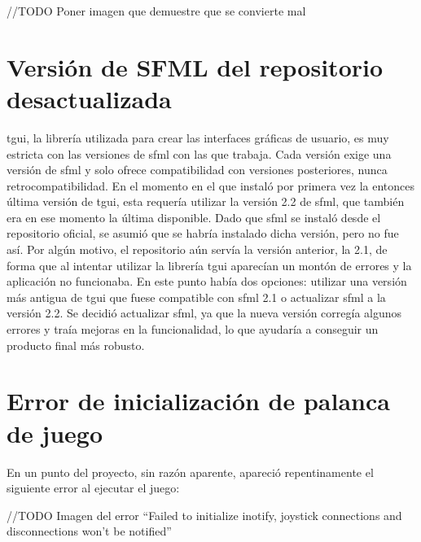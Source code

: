 	//TODO Poner imagen que demuestre que se convierte mal

\section{Versión de SFML del repositorio desactualizada}

	\acrshort{tgui}, la librería utilizada para crear las interfaces gráficas de usuario, es muy estricta con las versiones de \acrshort{sfml} con las que trabaja. Cada versión exige una versión de \acrshort{sfml} y solo ofrece compatibilidad con versiones posteriores, nunca retrocompatibilidad. En el momento en el que instaló por primera vez la entonces última versión de \acrshort{tgui}, esta requería utilizar la versión 2.2 de \acrshort{sfml}, que también era en ese momento la última disponible. Dado que \acrshort{sfml} se instaló desde el repositorio oficial, se asumió que se habría instalado dicha versión, pero no fue así. Por algún motivo, el repositorio aún servía la versión anterior, la 2.1, de forma que al intentar utilizar la librería \acrshort{tgui} aparecían un montón de errores y la aplicación no funcionaba. En este punto había dos opciones: utilizar una versión más antigua de \acrshort{tgui} que fuese compatible con \acrshort{sfml} 2.1 o actualizar \acrshort{sfml} a la versión 2.2. Se decidió actualizar \acrshort{sfml}, ya que la nueva versión corregía algunos errores y traía mejoras en la funcionalidad, lo que ayudaría a conseguir un producto final más robusto.

\section{Error de inicialización de palanca de juego}

	En un punto del proyecto, sin razón aparente, apareció repentinamente el siguiente error al ejecutar el juego:

	//TODO Imagen del error ``Failed to initialize inotify, joystick connections and disconnections won't be notified''

